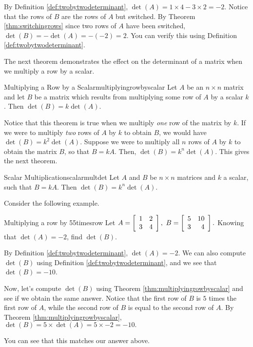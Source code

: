 \begin{solution}
By Definition \ref{def:twobytwodeterminant}, 
$\det \left(A\right) = 1 \times 4 - 3 \times 2 = -2$. 
Notice that the rows of $B$ are the rows of $A$ but switched. 
By Theorem \ref{thm:switchingrows} since two rows of $A$ have been switched,
$\det \left(B\right) = - \det \left(A\right) = - \left(-2\right) = 2$.
You can verify this using Definition \ref{def:twobytwodeterminant}. 
\end{solution}

The next theorem demonstrates the effect on the determinant of a matrix when we multiply
a row by a scalar.

\begin{theorem}{Multiplying a Row by a Scalar}{multiplyingrowbyscalar}
Let $A$ be an $n\times n$ matrix and let $B$ be a matrix
which results from multiplying some row of $A$ by a scalar $k$. Then $\det
\left( B\right) = k \det \left( A\right) $.
\end{theorem}

Notice that this theorem is true when we multiply {\em one\em} row of the matrix by $k$.
If we were to multiply {\em two\em} rows of $A$ by $k$ to obtain $B$, we would have
$\det \left(B\right) = k^2 \det \left(A\right)$.
Suppose we were to multiply all $n$ rows of $A$ by $k$ to obtain the matrix $B$, so that 
$B = kA$. Then, $\det \left(B\right) = k^n \det \left(A\right)$. This gives the next theorem.

\begin{theorem}{Scalar Multiplication}{scalarmultdet}
Let $A$ and $B$ be $n \times n$ matrices and $k$ a scalar, such that $B = kA$. Then $\det(B) = k^n \det(A)$.
\end{theorem}

Consider the following example.

\begin{example}{Multiplying a row by 5}{5timesrow}
Let $A=\left[
\begin{array}{rr}
1 & 2 \\
3 & 4
\end{array}
\right] ,\ B=\left[
\begin{array}{rr}
5 & 10 \\
3 & 4
\end{array}
\right] .$ 
Knowing that $\det \left( A \right) =-2$, find  $\det \left( B \right) $.
\end{example}

\begin{solution} 
By Definition \ref{def:twobytwodeterminant}, $\det \left( A\right) =-2.$ We can also compute
$\det \left(B\right)$ using Definition \ref{def:twobytwodeterminant}, and we see that $\det \left(B\right) = -10$. 

Now, let's compute  $\det \left(B\right)$ using Theorem \ref{thm:multiplyingrowbyscalar} and see if we
obtain the same answer. Notice that the first row of $B$ is $5$ times the first row of $A$, while the
second row of $B$ is equal to the second row of $A$. 
By Theorem \ref{thm:multiplyingrowbyscalar}, 
$\det  \left( B \right) = 5 \times \det \left( A \right) = 5 \times -2 = -10.$

You can see that this matches our answer above.
\end{solution}

